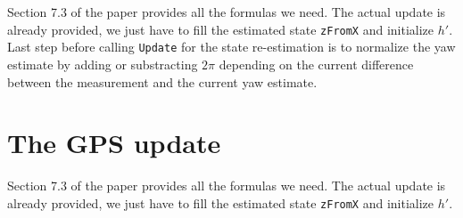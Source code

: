 \documentclass[12pt]{article}
\begin{document}
Section 7.3 of the paper provides all the formulas we need. The actual update is already provided, we just have to fill the estimated state \verb+zFromX+ and initialize $h'$. Last step before calling \verb+Update+ for the state re-estimation is to normalize the yaw estimate by adding or substracting $2\pi$ depending on the current difference between the measurement and the current yaw estimate.

\section{The GPS update}
	
Section 7.3 of the paper provides all the formulas we need. The actual update is already provided, we just have to fill the estimated state \verb+zFromX+ and initialize $h'$.
\end{document}
